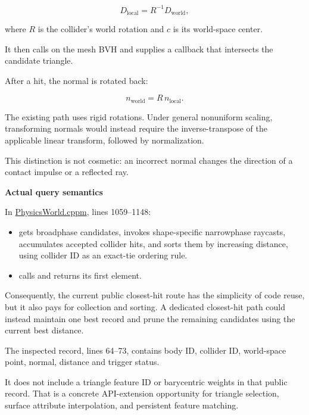 \[
D_{\text{local}}=R^{-1}D_{\text{world}},
\]

where \(R\) is the collider's world rotation and \(c\) is its world-space center.

It then calls  on the mesh BVH and supplies a callback that intersects the candidate triangle.

After a hit, the normal is rotated back:

\[
n_{\text{world}}=R\,n_{\text{local}}.
\]

The existing path uses rigid rotations. Under general nonuniform scaling, transforming normals would instead require the inverse-transpose of the applicable linear transform, followed by normalization.

This distinction is not cosmetic: an incorrect normal changes the direction of a contact impulse or a reflected ray.

\textbf{Actual query semantics}

In \href{https://github.com/swayam8624/KairoPhysicsEngine/blob/main/PhysicsWorld.cppm?utm_source=chatgpt.com}{PhysicsWorld.cppm}, lines 1059--1148:

\begin{itemize}
\tightlist
\item
   gets broadphase candidates, invokes shape-specific narrowphase raycasts, accumulates accepted collider hits, and sorts them by increasing distance, using collider ID as an exact-tie ordering rule.
\item
   calls  and returns its first element.
\end{itemize}

Consequently, the current public closest-hit route has the simplicity of code reuse, but it also pays for collection and sorting. A dedicated closest-hit path could instead maintain one best record and prune the remaining candidates using the current best distance.

The inspected  record, lines 64--73, contains body ID, collider ID, world-space point, normal, distance and trigger status.

It does not include a triangle feature ID or barycentric weights in that public record. That is a concrete API-extension opportunity for triangle selection, surface attribute interpolation, and persistent feature matching.

